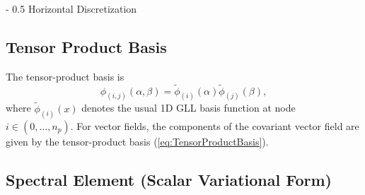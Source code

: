 \documentclass{article}
\makeatletter
\renewcommand\section{\@startsection
  {section}{2}{0mm}%
  {-\baselineskip}%
  {0.5\baselineskip}%
  {\normalfont\Huge\bfseries}}%
\newcommand{\vb}{\mathbf}
\newcommand{\pdiff}[2]{\frac{\partial #1}{\partial #2}}
\makeatother
\begin{document}

\section{Horizontal Discretization}

\subsection{Tensor Product Basis}

The tensor-product basis is
\begin{equation} \label{eq:TensorProductBasis}
\phi_{(i,j)}(\alpha, \beta) = \tilde{\phi}_{(i)}(\alpha) \tilde{\phi}_{(j)}(\beta),
\end{equation} where $\tilde{\phi}_{(i)}(x)$ denotes the usual 1D GLL basis function at node $i \in (0, \ldots, n_p)$.  For vector fields, the components of the covariant vector field are given by the tensor-product basis (\ref{eq:TensorProductBasis}).

\subsection{Spectral Element (Scalar Variational Form)}
\end{document}

